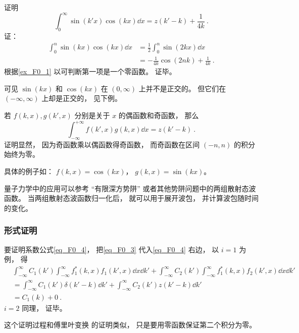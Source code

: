 \begin{example}{}
证明
\begin{equation}
\int_0^\infty \sin(k'x)\cos(kx) \dd{x} = z(k' - k) + \frac{1}{4k}~.
\end{equation}
证：
\begin{equation}
\begin{aligned}
\int_0^n \sin(kx)\cos(kx) \dd{x} &= \frac{1}{2} \int_0^n \sin(2kx) \dd{x}\\
&= -\frac{1}{4k}\cos(2nk) + \frac{1}{4k}~.
\end{aligned}
\end{equation}
根据\autoref{ex_F0_1} 以可判断第一项是一个零函数。 证毕。

可见 $\sin(kx)$ 和 $\cos(kx)$ 在 $(0,\infty)$ 上并不是正交的。 但它们在 $(-\infty, \infty)$ 上却是正交的， 见下例。
\end{example}

\begin{example}{}\label{ex_F0_2}
若 $f(k,x),g(k',x)$ 分别是关于 $x$ 的偶函数和奇函数， 那么
\begin{equation}
\int_{-\infty}^{+\infty} f(k', x) g(k, x) \dd{x} = z(k'-k)~.
\end{equation}
证明显然， 因为奇函数乘以偶函数得奇函数， 而奇函数在区间 $(-n, n)$ 的积分始终为零。

具体的例子如： $f(k,x) = \cos(kx)$， $g(k, x) = \sin(kx)$。
\end{example}

量子力学中的应用可以参考 “有限深方势阱” 或者其他势阱问题中的两组散射态波函数。 当两组散射态波函数归一化后， 就可以用于展开波包， 并计算波包随时间的变化。

\subsubsection{形式证明}
要证明系数公式\autoref{eq_F0_4}， 把\autoref{eq_F0_3} 代入\autoref{eq_F0_4} 右边， 以 $i = 1$ 为例， 得
\begin{equation}
\begin{aligned}
&\int_{-\infty}^{\infty} C_1(k') \int_{-\infty}^{\infty} f_1^*(k, x) f_1(k', x)\dd{x} \dd{k'} + \int_{-\infty}^{\infty} C_2(k') \int_{-\infty}^{\infty} f_1^*(k, x)f_2(k', x)\dd{x} \dd{k'}\\
&= \int_{-\infty}^{\infty} C_1(k') \delta(k' - k) \dd{k'} + \int_{-\infty}^{\infty} C_2(k') z(k' - k) \dd{k'}\\
&= C_1(k) + 0~.
\end{aligned}
\end{equation}
$i = 2$ 同理， 证毕。

这个证明过程和傅里叶变换 的证明类似， 只是要用零函数保证第二个积分为零。
